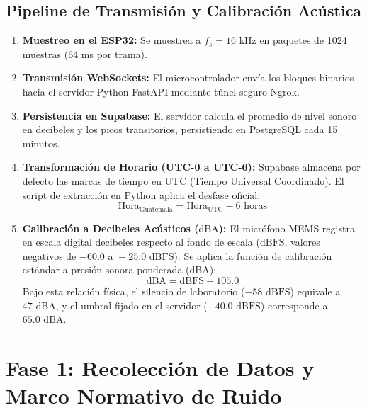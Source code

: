 \documentclass{article}
\begin{document}
\subsection{Pipeline de Transmisión y Calibración Acústica}
\begin{enumerate}
    \item \textbf{Muestreo en el ESP32:} Se muestrea a $f_s = 16\text{ kHz}$ en paquetes de 1024 muestras (64 ms por trama).
    \item \textbf{Transmisión WebSockets:} El microcontrolador envía los bloques binarios hacia el servidor Python FastAPI mediante túnel seguro Ngrok.
    \item \textbf{Persistencia en Supabase:} El servidor calcula el promedio de nivel sonoro en decibeles y los picos transitorios, persistiendo en PostgreSQL cada 15 minutos.
    \item \textbf{Transformación de Horario (UTC-0 a UTC-6):} Supabase almacena por defecto las marcas de tiempo en UTC (Tiempo Universal Coordinado). El script de extracción en Python aplica el desfase oficial:
    \begin{equation}
        \text{Hora}_{\text{Guatemala}} = \text{Hora}_{\text{UTC}} - 6\text{ horas}
    \end{equation}
    \item \textbf{Calibración a Decibeles Acústicos ($\text{dBA}$):} El micrófono MEMS registra en escala digital decibeles respecto al fondo de escala ($\text{dBFS}$, valores negativos de $-60.0\text{ a }-25.0\text{ dBFS}$). Se aplica la función de calibración estándar a presión sonora ponderada ($\text{dBA}$):
    \begin{equation}
        \text{dBA} = \text{dBFS} + 105.0
    \end{equation}
    Bajo esta relación física, el silencio de laboratorio ($-58\text{ dBFS}$) equivale a $47\text{ dBA}$, y el umbral fijado en el servidor ($-40.0\text{ dBFS}$) corresponde a $65.0\text{ dBA}$.
\end{enumerate}

\section{Fase 1: Recolección de Datos y Marco Normativo de Ruido}
\end{document}

